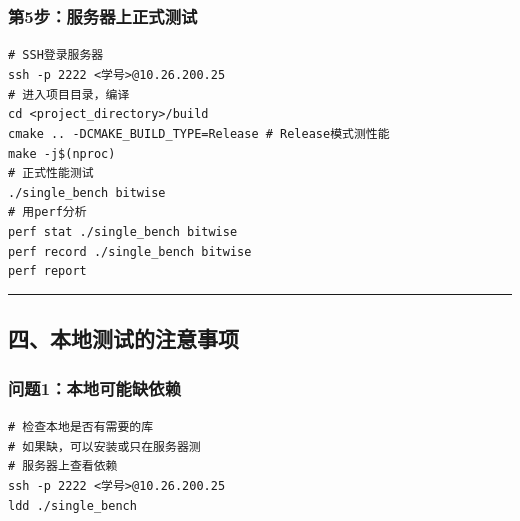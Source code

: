\documentclass[11pt, a4paper]{article}
\begin{document}
\begin{aibox}
\subsubsection*{第5步：服务器上正式测试}
\begin{tcolorbox}[colback=white,colframe=gray!50!white,boxrule=0.5pt,arc=2pt,left=5pt,right=5pt,top=5pt,bottom=5pt]
\texttt{\# SSH登录服务器}\\
\texttt{ssh -p 2222 \textless 学号\textgreater @10.26.200.25}\\[0.5em]
\texttt{\# 进入项目目录，编译}\\
\texttt{cd \textless project\_directory\textgreater /build}\\
\texttt{cmake .. -DCMAKE\_BUILD\_TYPE=Release  \# Release模式测性能}\\
\texttt{make -j\$(nproc)}\\[0.5em]
\texttt{\# 正式性能测试}\\
\texttt{./single\_bench bitwise}\\[0.5em]
\texttt{\# 用perf分析}\\
\texttt{perf stat ./single\_bench bitwise}\\
\texttt{perf record ./single\_bench bitwise}\\
\texttt{perf report}
\end{tcolorbox}

\begin{center}\rule{\textwidth}{0.4pt}\end{center}

\subsection*{四、本地测试的注意事项}

\subsubsection*{问题1：本地可能缺依赖}
\begin{tcolorbox}[colback=white,colframe=gray!50!white,boxrule=0.5pt,arc=2pt,left=5pt,right=5pt,top=5pt,bottom=5pt]
\texttt{\# 检查本地是否有需要的库}\\
\texttt{\# 如果缺，可以安装或只在服务器测}\\[0.5em]
\texttt{\# 服务器上查看依赖}\\
\texttt{ssh -p 2222 \textless 学号\textgreater @10.26.200.25}\\
\texttt{ldd ./single\_bench}
\end{tcolorbox}


\end{aibox}
\end{document}
